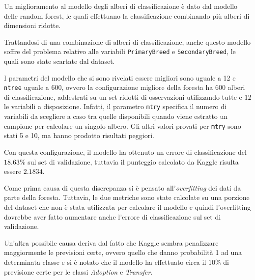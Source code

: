 Un miglioramento al modello degli alberi di classificazione è dato dal modello delle random forest, le quali effettuano la classificazione combinando più alberi di dimensioni ridotte.

Trattandosi di una combinazione di alberi di classificazione, anche questo modello soffre del problema relativo alle variabili \texttt{PrimaryBreed} e \texttt{SecondaryBreed}, le quali sono state scartate dal dataset.

I parametri del modello che si sono rivelati essere migliori sono  uguale a 12 e \texttt{ntree} uguale a 600, ovvero la configurazione migliore della foresta ha 600 alberi di classificazione, addestrati su un set ridotti di osservazioni utilizzando tutte e 12 le variabili a disposizione. Infatti, il parametro \texttt{mtry} specifica il numero di variabili da scegliere a caso tra quelle disponibili quando viene estratto un campione per calcolare un singolo albero.
Gli altri valori provati per \texttt{mtry} sono stati 5 e 10, ma hanno prodotto risultati peggiori.

Con questa configurazione, il modello ha ottenuto un errore di classificazione del $18.63\%$ sul set di validazione, tuttavia il punteggio calcolato da Kaggle risulta essere $2.1834$.

Come prima causa di questa discrepanza si è pensato all'\textit{overfitting} dei dati da parte della foresta. Tuttavia, le due metriche sono state calcolate su una porzione del dataset che non è stata utilizzata per calcolare il modello e quindi l'overfitting dovrebbe aver fatto aumentare anche l'errore di classificazione sul set di validazione.

Un'altra possibile causa deriva dal fatto che Kaggle sembra penalizzare maggiormente le previsioni certe, ovvero quello che danno probabilità 1 ad una determinata classe e si è notato che il modello ha effettuato circa il $10\%$ di previsione certe per le classi \textit{Adoption} e \textit{Transfer}.

